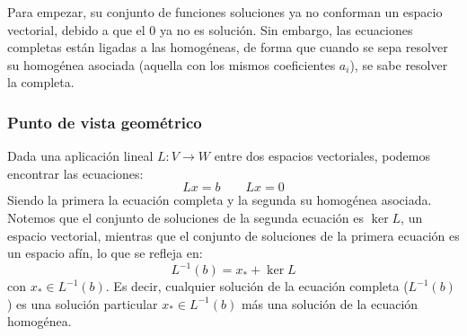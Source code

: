 Para empezar, su conjunto de funciones soluciones ya no conforman un espacio vectorial, debido a que el 0 ya no es solución. Sin embargo, las ecuaciones completas están ligadas a las homogéneas, de forma que cuando se sepa resolver su homogénea asociada (aquella con los mismos coeficientes $a_i$), se sabe resolver la completa.

\subsubsection{Punto de vista geométrico}
\noindent
Dada una aplicación lineal $L:V\rightarrow W$ entre dos espacios vectoriales, podemos encontrar las ecuaciones:
\begin{equation*}
    Lx = b \qquad Lx = 0
\end{equation*}
Siendo la primera la ecuación completa y la segunda su homogénea asociada. Notemos que el conjunto de soluciones de la segunda ecuación es $\ker L$, un espacio vectorial, mientras que el conjunto de soluciones de la primera ecuación es un espacio afín, lo que se refleja en:
\begin{equation*}
    L^{-1}(b) = x_{\ast} + \ker L
\end{equation*}
con $x_{\ast}\in L^{-1}(b)$. Es decir, cualquier solución de la ecuación completa ($L^{-1}(b)$) es una solución particular $x_\ast\in L^{-1}(b)$ más una solución de la ecuación homogénea.

